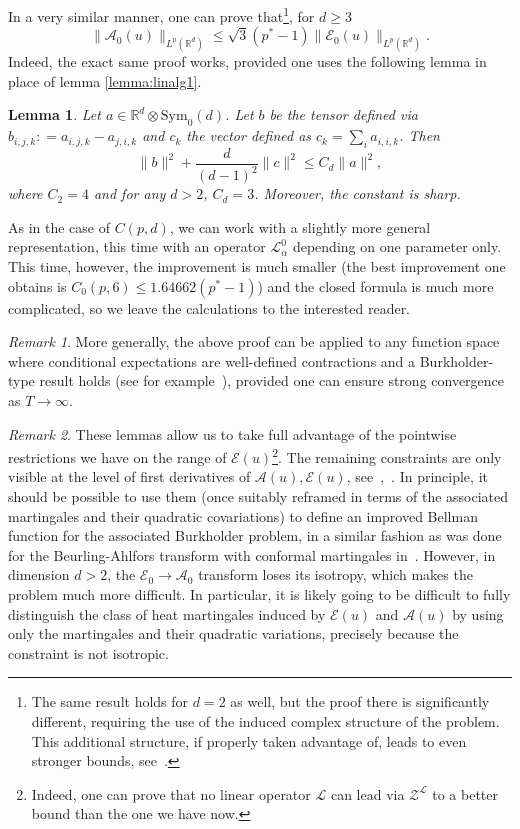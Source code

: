 \documentclass[11pt, a4paper]{amsart}
\newtheorem{lemma}[theorem]{Lemma}
\theoremstyle{definition}
\theoremstyle{remark}
\newtheorem{remark}{Remark}
\newcommand{\R}{\mathbb{R}}
\begin{document}
In a very similar manner,
one can prove that\footnote{The same result holds
for $d=2$ as 
well, but the proof there is significantly different,
requiring the use of the induced complex structure of
the problem. This additional structure, if properly
taken advantage of, leads to even stronger bounds,
see~\cite{Volberg}.},
for $d\ge 3$
\begin{equation*}
\|\mathcal A_0(u)\|_{L^p(\R^d)}\le
\sqrt{3}(p^*-1)\|\mathcal E_0(u)\|_{L^p(\R^d)}.
\end{equation*}
Indeed, the exact same proof works, provided one
uses the following lemma in place of lemma 
\ref{lemma:linalg1}.
\begin{lemma}\label{lemma:linalg2}
Let $a\in \R^d\otimes \mathrm{Sym}_0(d)$.
Let $b$ be the tensor defined via
$b_{i,j,k}\mathrel{:}=a_{i,j,k}-a_{j,i,k}$
and $c_k$ the vector defined
as $c_k=\sum_i a_{i,i,k}$. Then
\begin{equation*}
\|b\|^2+\frac{d}{(d-1)^2}\|c\|^2\le C_d \|a\|^2,
\end{equation*}
where $C_2=4$ and for any $d>2$, $C_d=3$.
Moreover, the constant is sharp.
\end{lemma}
As in the case of $C(p,d)$, we can work with a slightly more
general representation, this time with an operator
$\mathcal L^0_\alpha$ depending on one parameter only.
This time, however, the improvement is much smaller
(the best improvement one obtains is $C_0(p,6)\le 1.64662(p^*-1)$)
and the closed formula is much more complicated, so we leave the 
calculations to the interested reader.
\begin{remark}
More generally, the above proof can be applied
to any function space where conditional expectations
are well-defined contractions
and a Burkholder-type result holds
(see for example~\cite[chapter 5]{osekowski}),
provided one can ensure
strong convergence as $T\to \infty$.
\end{remark}
\begin{remark}\label{rmk:bellmanisotropic}
These lemmas allow us to take full advantage
of the pointwise restrictions
we have on the range of $\mathcal E(u)$\footnote{Indeed, 
one can prove that no linear operator 
$\mathcal L$ can lead via $\mathcal Z^{\mathcal L}$
to a better bound than the one we have now.}.
The remaining constraints are
only visible at the level of first derivatives of
$\mathcal A(u), \mathcal E(u)$,
see~\cite{Amrouche2006},~\cite{Eastwood2000}.
In principle, it should be possible to use them
(once suitably reframed
in terms of the associated martingales
and their quadratic covariations) to 
define an improved Bellman function for the associated 
Burkholder problem, in a similar fashion as was done
for the Beurling-Ahlfors transform
with conformal martingales in~\cite{Volberg}.
However, in dimension $d>2$, 
the $\mathcal E_0\to \mathcal A_0$
transform loses its isotropy, which 
makes the problem much more difficult. In particular, it
is likely going to be difficult
to fully distinguish the class of heat 
martingales induced by $\mathcal E(u)$ and
$\mathcal A(u)$ by using only the martingales and their
quadratic variations, precisely because the
constraint is not isotropic.
\end{remark}
\end{document}
